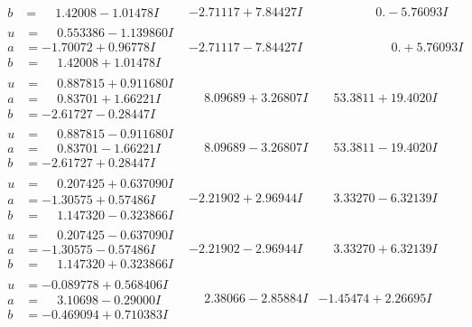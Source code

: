 \documentclass[1p]{elsarticle_modified}
\theoremstyle{definition}
\begin{document}
$$\begin{array}{c|c|c}
\begin{aligned}
b &= \phantom{-}1.42008 - 1.01478 I\end{aligned}
 & -2.71117 + 7.84427 I & \phantom{-0.000000 } 0. - 5.76093 I \\ \hline\begin{aligned}
u &= \phantom{-}0.553386 - 1.139860 I \\
a &= -1.70072 + 0.96778 I \\
b &= \phantom{-}1.42008 + 1.01478 I\end{aligned}
 & -2.71117 - 7.84427 I & \phantom{-0.000000 -}0. + 5.76093 I \\ \hline\begin{aligned}
u &= \phantom{-}0.887815 + 0.911680 I \\
a &= \phantom{-}0.83701 + 1.66221 I \\
b &= -2.61727 - 0.28447 I\end{aligned}
 & \phantom{-}8.09689 + 3.26807 I & \phantom{-}53.3811 + 19.4020 I \\ \hline\begin{aligned}
u &= \phantom{-}0.887815 - 0.911680 I \\
a &= \phantom{-}0.83701 - 1.66221 I \\
b &= -2.61727 + 0.28447 I\end{aligned}
 & \phantom{-}8.09689 - 3.26807 I & \phantom{-}53.3811 - 19.4020 I \\ \hline\begin{aligned}
u &= \phantom{-}0.207425 + 0.637090 I \\
a &= -1.30575 + 0.57486 I \\
b &= \phantom{-}1.147320 - 0.323866 I\end{aligned}
 & -2.21902 + 2.96944 I & \phantom{-}3.33270 - 6.32139 I \\ \hline\begin{aligned}
u &= \phantom{-}0.207425 - 0.637090 I \\
a &= -1.30575 - 0.57486 I \\
b &= \phantom{-}1.147320 + 0.323866 I\end{aligned}
 & -2.21902 - 2.96944 I & \phantom{-}3.33270 + 6.32139 I \\ \hline\begin{aligned}
u &= -0.089778 + 0.568406 I \\
a &= \phantom{-}3.10698 - 0.29000 I \\
b &= -0.469094 + 0.710383 I\end{aligned}
 & \phantom{-}2.38066 - 2.85884 I & -1.45474 + 2.26695 I \\ \hline\begin{aligned}

\end{aligned}
\end{array}$$
\end{document}
